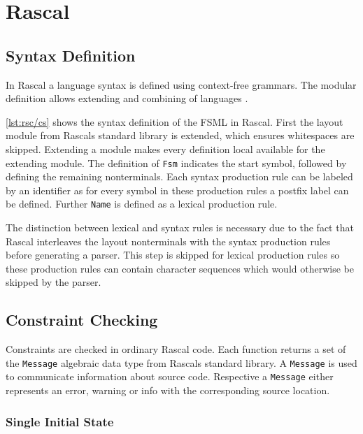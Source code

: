 \section{Rascal}
\label{s:rascal}

\subsection{Syntax Definition}

In Rascal a language syntax is defined using context-free grammars.
The modular definition allows extending and combining of languages \cite{van2011rascal}.

\autoref{lst:rsc/cs} shows the syntax definition of the FSML in Rascal.
First the layout module from Rascals standard library is extended, which ensures whitespaces are skipped.
Extending a module makes every definition local available for the extending module.
The definition of \lstinline[language=rascal]{Fsm} indicates the start symbol, followed by defining the remaining nonterminals.
Each syntax production rule can be labeled by an identifier as for every symbol in these production rules a postfix label can be defined.
Further \lstinline[language=rascal]{Name} is defined as a lexical production rule.

The distinction between lexical and syntax rules is necessary due to the fact that Rascal interleaves the layout nonterminals with the syntax production rules before generating a parser.
This step is skipped for lexical production rules so these production rules can contain character sequences which would otherwise be skipped by the parser.



\subsection{Constraint Checking}

Constraints are checked in ordinary Rascal code.
Each function returns a set of the \lstinline[language=rascal]{Message} algebraic data type from Rascals standard library.
A \lstinline[language=rascal]{Message} is used to communicate information about source code.
Respective a \lstinline[language=rascal]{Message} either represents an error, warning or info with the corresponding source location.

\subsubsection{Single Initial State}

